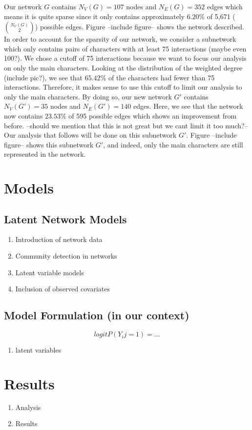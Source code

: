 \documentclass{article}
\begin{document}
Our network $G$ contains $N_V(G) = 107$ nodes and $N_E(G) = 352$ edges which means it is quite sparse since it only contains approximately $6.20\%$ of 5,671 ($N_V(G) \choose 2$) possible edges. Figure --include figure-- shows the network described. In order to account for the sparsity of our network, we consider a subnetwork which only contains pairs of characters with at least 75 interactions (maybe even 100?). We chose a cutoff of 75 interactions because we want to focus our analysis on only the main characters. Looking at the distribution of the weighted degree (include pic?), we see that $65.42\%$ of the characters had fewer than 75 interactions. Therefore, it makes sense to use this cutoff to limit our analysis to only the main characters. By doing so, our new network $G'$ contains $N_V(G') = 35$ nodes and $N_E(G') = 140$ edges. Here, we see that the network now contains $23.53\%$ of 595 possible edges which shows an improvement from before. --should we mention that this is not great but we cant limit it too much?-- Our analysis that follows will be done on this subnetwork $G'$. Figure --include figure-- shows this subnetwork $G'$, and indeed, only the main characters are still represented in the network. 

\section{Models}
\subsection{Latent Network Models}
\begin{enumerate}
    \item Introduction of network data
    \item Community detection in networks
    \item Latent variable models 
    \item Inclusion of observed covariates
\end{enumerate}

\subsection{Model Formulation (in our context)}
$$logit P(Y_ij = 1) = ... $$
\begin{enumerate}
	\item latent variables 
\end{enumerate}

\section{Results}
\begin{enumerate}
    \item Analysis
    \item Results
\end{enumerate}
\end{document}
